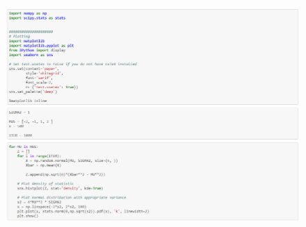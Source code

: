 \documentclass[12pt]{article}
\begin{document}
\begin{figure}[p]
	\centering
	\includegraphics[width=\textwidth]{Code1.PNG}
\end{figure}
\end{document}
